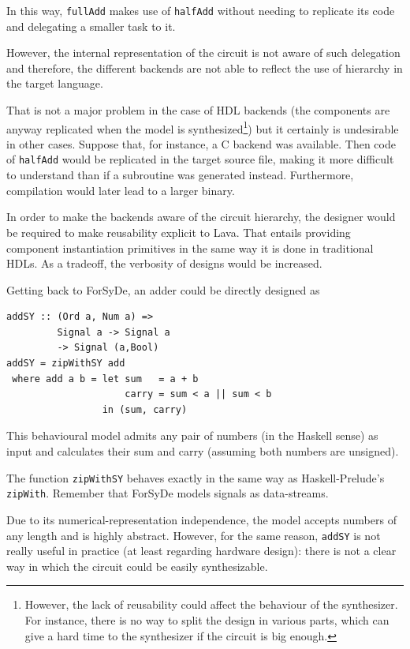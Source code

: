 \documentclass[a4paper,twoside,11pt]{article}
\begin{document}
\begin{body}
\begin{itemize}
    In this way, \texttt{fullAdd} makes use of \texttt{halfAdd} without
    needing to replicate its code and delegating a smaller task to it.
    
    However, the internal representation of the circuit is not
    aware of such delegation and therefore, the different backends
    are not able to reflect the use of hierarchy in the target language.

    That is not a major problem in the case of HDL backends (the components
    are anyway replicated when the model is synthesized\footnote{However, the
      lack of reusability could affect the behaviour of the synthesizer. For
      instance, there is no way to split the design in various parts, which
      can give a hard time to the synthesizer if the circuit is big enough.})
    but it certainly is undesirable in other cases. Suppose that, for
    instance, a C backend was available. Then code of \texttt{halfAdd} would
    be replicated in the target source file, making it more difficult to
    understand than if a subroutine was generated instead.  Furthermore,
    compilation would later lead to a larger binary.

    In order to make the backends aware of the circuit hierarchy, the designer
    would be required to make reusability explicit to Lava.  That entails
    providing component instantiation primitives in the same way it is done in
    traditional HDLs. As a tradeoff, the verbosity of designs would be
    increased.
 
\end{itemize} 

Getting back to ForSyDe, an adder could be directly designed as

\begin{lstlisting}
addSY :: (Ord a, Num a) => 
         Signal a -> Signal a 
         -> Signal (a,Bool)
addSY = zipWithSY add
 where add a b = let sum   = a + b
                     carry = sum < a || sum < b 
                 in (sum, carry)
\end{lstlisting} 

This behavioural model admits any pair of numbers (in the Haskell sense) as
input and calculates their sum and carry (assuming both numbers are unsigned).

The function \texttt{zipWithSY} behaves exactly in the same way as
Haskell-Prelude's \texttt{zipWith}. Remember that ForSyDe models
signals as data-streams.

Due to its numerical-representation independence, the model accepts numbers of
any length and is highly abstract. However, for the same reason,
\texttt{addSY} is not really useful in practice (at least regarding hardware
design): there is not a clear way in which the circuit could be easily
synthesizable.


\end{body}
\end{document}
